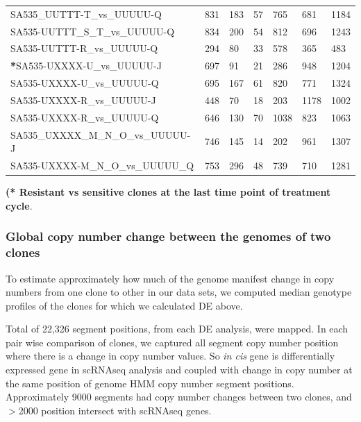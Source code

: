\begin{landscape}
\begin{table}
{\begin{tabular}{|l|p{3.8em}|p{3.8em}|p{3.8em}|p{3.8em}|p{3.8em}|p{3.8em}|}
SA535\_UUTTT-T\_vs\_UUUUU-Q        & 831 & 183 & 57  & 765  & 681  & 1184 \\
SA535-UUTTT\_S\_T\_vs\_UUUUU-Q     & 834 & 200 & 54  & 812  & 696  & 1243 \\
SA535-UUTTT-R\_vs\_UUUUU-Q         & 294 & 80  & 33  & 578  & 365  & 483  \\
\textbf{*}SA535-UXXXX-U\_vs\_UUUUU-J & 697 & 91  & 21  & 286  & 948  & 1204 \\
SA535-UXXXX-U\_vs\_UUUUU-Q         & 695 & 167 & 61  & 820  & 771  & 1324 \\
SA535-UXXXX-R\_vs\_UUUUU-J         & 448 & 70  & 18  & 203  & 1178 & 1002 \\
SA535-UXXXX-R\_vs\_UUUUU-Q         & 646 & 130 & 70  & 1038 & 823  & 1063 \\
SA535\_UXXXX\_M\_N\_O\_vs\_UUUUU-J & 746 & 145 & 14  & 202  & 961  & 1307 \\
SA535-UXXXX-M\_N\_O\_vs\_UUUUU\_Q  & 753 & 296 & 48  & 739  & 710  & 1281 \\
  \hline

\end{tabular}
}

\label{tab:numberofDEgenesincistrans}

  \small\textbf{(* Resistant vs sensitive clones at the last time point of treatment cycle}.
\end{table}
\end{landscape}



\subsubsection{Global copy number change between the genomes of two clones}

To estimate approximately how much of the genome manifest change in copy numbers from one clone to other in our data sets, we computed median genotype profiles of the clones for which we calculated \ac{DE} above.

Total of 22,326 segment positions, from each DE analysis, were mapped. In each pair wise comparison of clones, we captured all segment copy number position where there is a change in copy number values. So \textit{in cis} gene is differentially expressed gene in scRNAseq analysis and coupled with change in copy number at the same position of genome HMM copy number segment positions. Approximately 9000 segments had copy number changes between two clones, and $>$2000 position intersect with scRNAseq genes.

